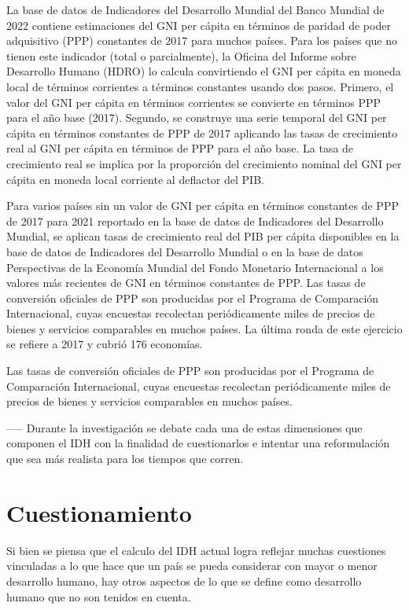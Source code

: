 \documentclass[
  10pt,
]{article}
\begin{document}
La base de datos de Indicadores del Desarrollo Mundial del Banco Mundial
de 2022 contiene estimaciones del GNI per cápita en términos de paridad
de poder adquisitivo (PPP) constantes de 2017 para muchos países. Para
los países que no tienen este indicador (total o parcialmente), la
Oficina del Informe sobre Desarrollo Humano (HDRO) lo calcula
convirtiendo el GNI per cápita en moneda local de términos corrientes a
términos constantes usando dos pasos. Primero, el valor del GNI per
cápita en términos corrientes se convierte en términos PPP para el año
base (2017). Segundo, se construye una serie temporal del GNI per cápita
en términos constantes de PPP de 2017 aplicando las tasas de crecimiento
real al GNI per cápita en términos de PPP para el año base. La tasa de
crecimiento real se implica por la proporción del crecimiento nominal
del GNI per cápita en moneda local corriente al deflactor del PIB.

Para varios países sin un valor de GNI per cápita en términos constantes
de PPP de 2017 para 2021 reportado en la base de datos de Indicadores
del Desarrollo Mundial, se aplican tasas de crecimiento real del PIB per
cápita disponibles en la base de datos de Indicadores del Desarrollo
Mundial o en la base de datos Perspectivas de la Economía Mundial del
Fondo Monetario Internacional a los valores más recientes de GNI en
términos constantes de PPP. Las tasas de conversión oficiales de PPP son
producidas por el Programa de Comparación Internacional, cuyas encuestas
recolectan periódicamente miles de precios de bienes y servicios
comparables en muchos países. La última ronda de este ejercicio se
refiere a 2017 y cubrió 176 economías.

Las tasas de conversión oficiales de PPP son producidas por el Programa
de Comparación Internacional, cuyas encuestas recolectan periódicamente
miles de precios de bienes y servicios comparables en muchos países.

----- Durante la investigación se debate cada una de estas dimensiones
que componen el IDH con la finalidad de cuestionarlos e intentar una
reformulación que sea más realista para los tiempos que corren.

\pagebreak

\hypertarget{cuestionamiento}{%
\section{Cuestionamiento}\label{cuestionamiento}}

Si bien se piensa que el calculo del IDH actual logra reflejar muchas
cuestiones vinculadas a lo que hace que un país se pueda considerar con
mayor o menor desarrollo humano, hay otros aspectos de lo que se define
como desarrollo humano que no son tenidos en cuenta.
\end{document}
